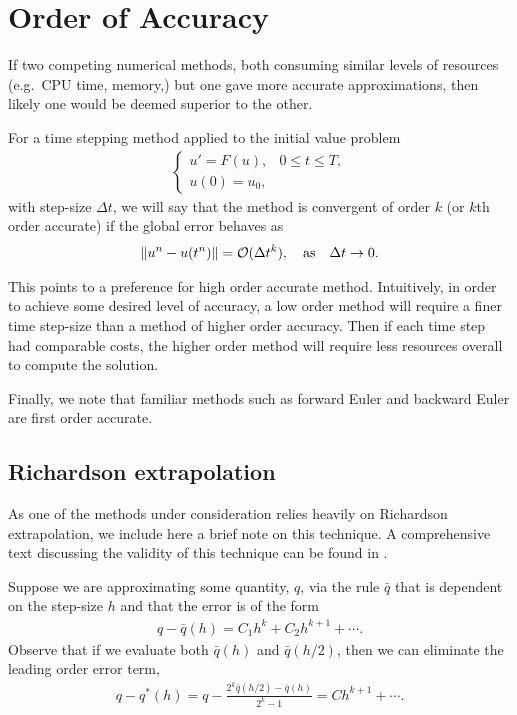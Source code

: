 \section{Order of Accuracy}
If two competing numerical methods, both consuming similar levels of resources (e.g.\ CPU time, memory,) but one gave more accurate approximations, then likely one would be deemed superior to the other. 

For a time stepping method applied to the initial value problem 
\begin{align}
\begin{cases}
        u' = F(u), & 0\leq t \leq T, \\
 u(0) = u_0, 
\end{cases}
\end{align}
with step-size $\Delta t$, 
we will say that the method is convergent of order $k$ (or $k$th order accurate) if the global error behaves as 
\begin{align}
        \left\lVert u^{n} - u(t^n)\right\rVert = \mathcal{O}(\Delta t^k),
\quad\text{as}\quad \Delta t \to 0.
\end{align}

This points to a preference for high order accurate method. Intuitively, in order to achieve some desired level of accuracy, a low order method will require a finer time step-size than a method of higher order accuracy. Then if each time step had comparable costs, the higher order method will require less resources overall to compute the solution. 

Finally, we note that familiar methods such as forward Euler and backward Euler are first order accurate.

\subsection{Richardson extrapolation}
As one of the methods under consideration relies heavily on Richardson extrapolation, we include here a brief note on this technique. A comprehensive text discussing the validity of this technique can be found in \cite{sidi2003practical}.

Suppose we are approximating some quantity, $q$, via the rule $\bar q$ that is dependent on the step-size $h$ and that the error is of the form 
\begin{align}
        q - \bar q(h) = C_1 h^k  + C_2 h^{k+1} + \cdots.
\end{align}
Observe that if we evaluate both $\bar q(h)$ and $\bar q(h/2)$, then we can eliminate the leading order error term,
\begin{align}
        q-q^*(h) = q-\frac{2^k \bar q(h/2)  -\bar q(h)}{2^k-1} 
= Ch^{k+1} + \cdots .
\end{align}

